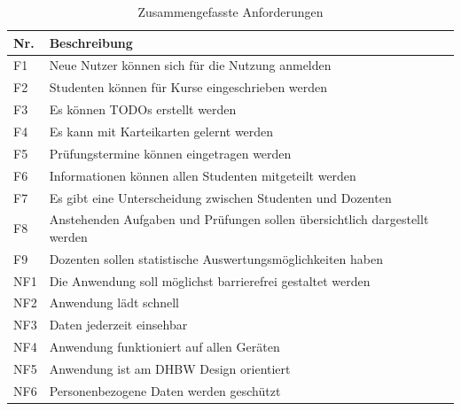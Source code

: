 \begin{table}[h]
    \centering
    \begin{tabularx}{.8\textwidth}{l|X}
        Nr.     & Beschreibung                              \\\hline
        F1      & Neue Nutzer können sich für die Nutzung anmelden                    \\
        F2      & Studenten können für Kurse eingeschrieben werden  \\
        F3      & Es können TODOs erstellt werden   \\
        F4      & Es kann mit Karteikarten gelernt werden  \\
        F5      & Prüfungstermine können eingetragen werden  \\
        F6      & Informationen können allen Studenten mitgeteilt werden  \\
        F7      & Es gibt eine Unterscheidung zwischen Studenten und Dozenten  \\
        F8      & Anstehenden Aufgaben und Prüfungen sollen übersichtlich dargestellt werden  \\
        F9      & Dozenten sollen statistische Auswertungsmöglichkeiten haben\\\hline
        NF1     & Die Anwendung soll möglichst barrierefrei gestaltet werden\\
        NF2     & Anwendung lädt schnell                    \\
        NF3     & Daten jederzeit einsehbar                 \\
        NF4     & Anwendung funktioniert auf allen Geräten  \\
        NF5     & Anwendung ist am DHBW Design orientiert   \\
        NF6     & Personenbezogene Daten werden geschützt  \\
    \end{tabularx}
    \caption{Zusammengefasste Anforderungen}
    \label{tab:anforderungen}
\end{table}



